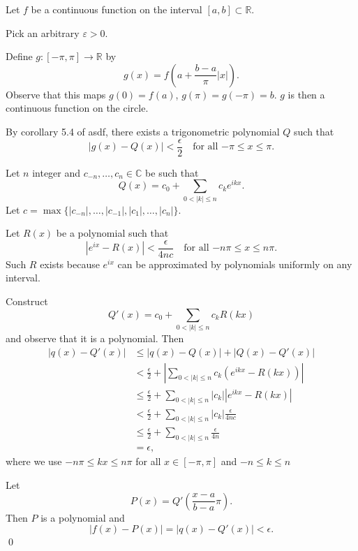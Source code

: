 \documentclass[oneside]{article}
\newcommand\abs[1]{\left|#1\right|}
\newcommand\bbC{\mathbb{C}}
\newcommand\bbR{\mathbb{R}}
\begin{document}
  Let $f$ be a continuous function on the interval $[a,b] \subset \bbR$.

  Pick an arbitrary $\varepsilon > 0$.

  Define $g : [-\pi, \pi] \to \bbR$ by\[
      g(x) = f\left(a + \frac{b-a}{\pi}\abs{x}\right) \text{.}
  \] Observe that this maps $g(0) = f(a)$, $g(\pi) = g(-\pi) = b$. $g$ is then
  a continuous function on the circle.

  By corollary 5.4 of asdf, there exists a trigonometric polynomial $Q$ such
  that \[
      \abs{g(x) - Q(x)} < \frac{\epsilon}{2}
      \quad\text{for all $-\pi \leq x \leq \pi$.}
  \]

  Let $n$ integer and $c_{-n}, \dots, c_{n} \in \bbC$ be such that \[
      Q(x) = c_0 + \sum_{0 < \abs{k} \leq n} c_k e^{ikx} \text{.}
  \] Let $c = \max\{\abs{c_{-n}}, \dots, \abs{c_{-1}},
  \abs{c_1}, \dots, \abs{c_{n}}\}$.

  Let $R(x)$ be a polynomial such that \[
      \abs{e^{ix} - R(x)} < \frac{\epsilon}{4nc}
      \quad\text{for all $-n\pi \leq x \leq n\pi$.}
  \] Such $R$ exists because $e^{ix}$ can be approximated by polynomials uniformly
  on any interval.

  Construct \[
    Q'(x) = c_0 + \sum_{0 < \abs{k} \leq n}c_k R(kx)
  \] and observe that it is a polynomial. Then \begin{align*}
    \abs{q(x) - Q'(x)}
    &\leq \abs{q(x) - Q(x)} + \abs{Q(x) - Q'(x)} \\
    &< \frac{\epsilon}{2}
    + \abs{\sum_{0 < \abs{k} \leq n}c_k\left(e^{ikx} - R(kx)\right)} \\
    &\leq \frac{\epsilon}{2}
    + \sum_{0 < \abs{k} \leq n}\abs{c_k}\abs{e^{ikx} - R(kx)} \\
    &< \frac{\epsilon}{2}
    + \sum_{0 < \abs{k} \leq n}\abs{c_k}\frac{\epsilon}{4nc} \\
    &\leq \frac{\epsilon}{2}
    + \sum_{0 < \abs{k} \leq n}\frac{\epsilon}{4n} \\
    &= \epsilon \text{,}
  \end{align*} where we use $-n\pi \leq kx \leq n\pi$ for all
  $x \in [-\pi, \pi]$ and $-n \leq k \leq n$

  Let \[
    P(x) = Q'\left(\frac{x-a}{b-a}\pi\right) \text{.}
  \] Then $P$ is a polynomial and \[
    \abs{f(x) - P(x)} = \abs{q(x) - Q'(x)} < \epsilon \text{.}
  \]\qed
\end{document}
